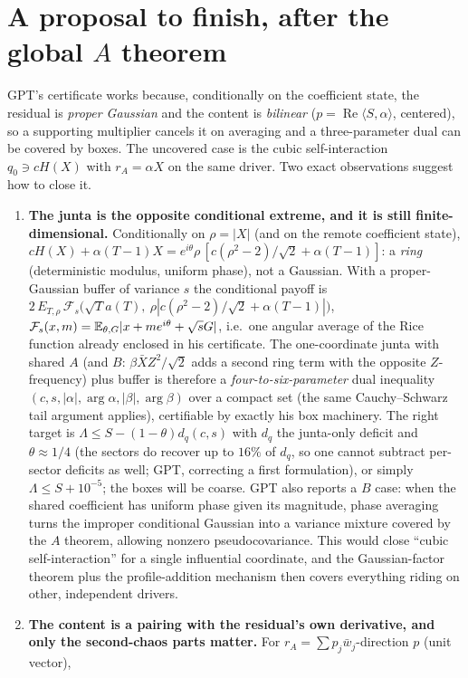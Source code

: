 \documentclass[11pt,a4paper]{article}
\renewcommand{\Re}{\operatorname{Re}}\newcommand{\Var}{\operatorname{Var}}\newcommand{\ph}{\operatorname{phase}}\newcommand{\st}[1]{\textsf{[#1]}}\newcommand{\brkus}{\textunderscore\allowbreak}\usepackage{xstring,adjustbox}\DeclareRobustCommand{\code}[1]{\begingroup\noexpandarg\StrSubstitute{#1}{/}{/\allowbreak}[\brktmp]\texttt{\let\_\brkus\hyphenchar\font=`\-\brktmp}\endgroup}\setlength{\emergencystretch}{3em}
\begin{document}
\section{A proposal to finish, after the global $A$ theorem}\label{sec:proposal}
GPT's certificate works because, conditionally on the coefficient state, the residual is \emph{proper Gaussian} and the content is \emph{bilinear} ($p=\Re\langle S,\alpha\rangle$, centered), so a
supporting multiplier cancels it on averaging and a three-parameter dual can be covered by boxes. The uncovered case is the cubic self-interaction $q_0\ni cH(X)$ with $r_A=\alpha X$ on
the same driver. Two exact observations suggest how to close it.
\begin{enumerate}
\item \textbf{The junta is the opposite conditional extreme, and it is still finite-dimensional.} Conditionally on $\rho=|X|$ (and on the remote coefficient state), $cH(X)+\alpha(T-1)X=
e^{i\theta}\rho\,[c(\rho^2-2)/\sqrt2+\alpha(T-1)]$: a \emph{ring} (deterministic modulus, uniform phase), not a Gaussian. With a proper-Gaussian buffer of variance $s$ the conditional
payoff is $2\,E_{T,\rho}\,\mathcal F_s\bigl(\sqrt Ta(T),\ \rho|c(\rho^2-2)/\sqrt2+\alpha(T-1)|\bigr)$, $\mathcal F_s(x,m)=\mathbb{E}_{\theta,G}|x+me^{i\theta}+\sqrt sG|$, i.e.\ one angular average of the
Rice function already enclosed in his certificate. The one-coordinate junta with shared $A$ (and $B$: $\beta\bar X Z^2/\sqrt2$ adds a second ring term with the opposite $Z$-frequency)
plus buffer is therefore a \emph{four-to-six-parameter} dual inequality $(c,s,|\alpha|,\arg\alpha,|\beta|,\arg\beta)$ over a compact set (the same Cauchy--Schwarz tail argument applies),
certifiable by exactly his box machinery. The right target is $\Lambda\le S-(1-\theta)d_q(c,s)$ with $d_q$ the junta-only deficit and $\theta\approx1/4$ (the sectors do recover up to $16\%$ of $d_q$, so one cannot subtract per-sector deficits as well; GPT, correcting a first formulation), or simply $\Lambda\le S+10^{-5}$; the boxes will be coarse. GPT also reports a $B$ case: when the shared coefficient has uniform phase given its magnitude, phase averaging turns the improper conditional Gaussian into a variance mixture covered by the $A$ theorem, allowing nonzero pseudocovariance. This would close
``cubic self-interaction'' for a single influential coordinate, and the Gaussian-factor theorem plus the profile-addition mechanism then covers everything riding on other, independent
drivers.
\item \textbf{The content is a pairing with the residual's own derivative, and only the second-chaos parts matter.} For $r_A=\sum p_j\bar w_j$-direction $p$ (unit vector),

\end{enumerate}
\end{document}
